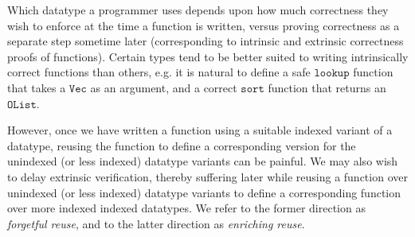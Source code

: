 \documentclass[acmsmall]{acmart}\settopmatter{}
\newcommand{\txt}[1]{\ensuremath{\texttt{#1}}}
\begin{document}
Which datatype a programmer uses depends upon how much correctness
they wish to enforce at the time a function is written, versus proving
correctness as a separate step sometime later (corresponding to
intrinsic and extrinsic correctness proofs of functions). Certain
types tend to be better suited to writing intrinsically correct
functions than others, e.g. it is natural to define a safe \txt{lookup}
function that takes a \txt{Vec} as an argument, and a correct \txt{sort}
function that returns an \txt{OList}.

However, once we have written a function using a suitable indexed
variant of a datatype, reusing the function to define a corresponding version
for the unindexed (or less indexed) datatype variants can be
painful. We may also wish to delay extrinsic verification, thereby
suffering later while reusing a function over unindexed (or less
indexed) datatype variants to define a corresponding function over
more indexed indexed datatypes. We refer to the former direction as
\textit{forgetful reuse}, and to the latter direction as
\textit{enriching reuse}.
\end{document}

